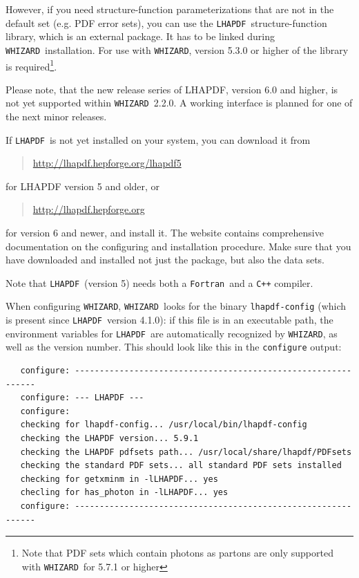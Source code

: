 \documentclass[12pt]{book}
\newcommand{\ttt}[1]{\texttt{#1}}
\newcommand{\whizard}{\texttt{WHIZARD}}
\newcommand{\lhapdf}{\texttt{LHAPDF}}
\newcommand{\fortran}{\texttt{Fortran}}
\begin{document}
However, if you need structure-function parameterizations that are not
in the default set (e.g. PDF error sets), you can use the \lhapdf\
structure-function library, which is an external package.  It has to
be linked during \whizard\ installation.  For use with \whizard,
version 5.3.0 or higher of the library is required\footnote{ Note that
  PDF sets which contain photons as partons are only supported with
  \whizard\ for 5.7.1 or higher}.

Please note, that the new release series of LHAPDF, version 6.0 and
higher, is not yet supported within \whizard\ 2.2.0. A working
interface is planned for one of the next minor releases. 

If \lhapdf\ is not yet installed on your system, you can download it from
\begin{quote}
\url{http://lhapdf.hepforge.org/lhapdf5}
\end{quote}
for LHAPDF version 5 and older, or 
\begin{quote}
  \url{http://lhapdf.hepforge.org}
\end{quote}
for version 6 and newer, and install it.  The website contains
comprehensive documentation on 
the configuring and installation procedure.  Make sure that you have
downloaded and installed not just the package, but also the data sets.

Note that \lhapdf\ (version 5) needs both a \fortran\ and a \ttt{C++}
compiler. 

When configuring \whizard, \whizard\ looks for the binary
\ttt{lhapdf-config} (which is present since \lhapdf\ version 4.1.0): if
this file is in an executable path, the environment variables for
\lhapdf\ are automatically recognized by \whizard, as well as the version
number. This should look like this in the \ttt{configure} output:   

\begin{footnotesize}
\begin{verbatim}
   configure: --------------------------------------------------------------
   configure: --- LHAPDF ---
   configure:
   checking for lhapdf-config... /usr/local/bin/lhapdf-config
   checking the LHAPDF version... 5.9.1
   checking the LHAPDF pdfsets path... /usr/local/share/lhapdf/PDFsets
   checking the standard PDF sets... all standard PDF sets installed
   checking for getxminm in -lLHAPDF... yes
   checling for has_photon in -lLHAPDF... yes
   configure: --------------------------------------------------------------
\end{verbatim}
\end{footnotesize}
\end{document}
